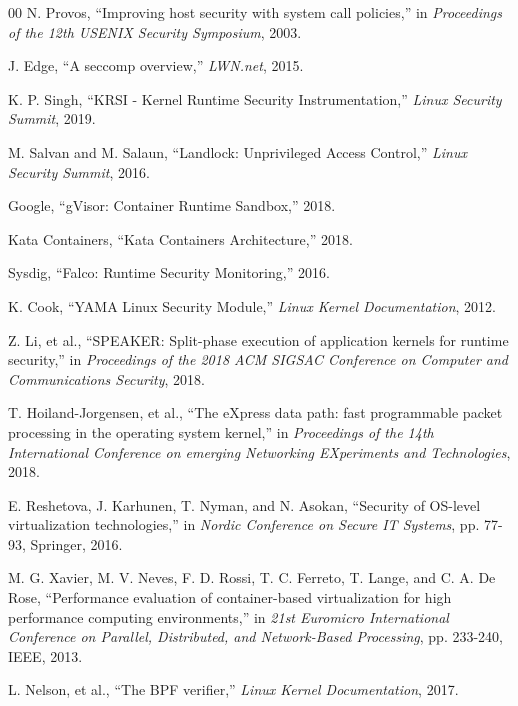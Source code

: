 \documentclass[conference]{IEEEtran}
\begin{document}

\begin{thebibliography}{00}
 N. Provos, ``Improving host security with system call policies,'' in \textit{Proceedings of the 12th USENIX Security Symposium}, 2003.

 J. Edge, ``A seccomp overview,'' \textit{LWN.net}, 2015.

 K. P. Singh, ``KRSI - Kernel Runtime Security Instrumentation,'' \textit{Linux Security Summit}, 2019.

 M. Salvan and M. Salaun, ``Landlock: Unprivileged Access Control,'' \textit{Linux Security Summit}, 2016.

 Google, ``gVisor: Container Runtime Sandbox,'' 2018.

 Kata Containers, ``Kata Containers Architecture,'' 2018.

 Sysdig, ``Falco: Runtime Security Monitoring,'' 2016.

 K. Cook, ``YAMA Linux Security Module,'' \textit{Linux Kernel Documentation}, 2012.

 Z. Li, et al., ``SPEAKER: Split-phase execution of application kernels for runtime security,'' in \textit{Proceedings of the 2018 ACM SIGSAC Conference on Computer and Communications Security}, 2018.

 T. Hoiland-Jorgensen, et al., ``The eXpress data path: fast programmable packet processing in the operating system kernel,'' in \textit{Proceedings of the 14th International Conference on emerging Networking EXperiments and Technologies}, 2018.

 E. Reshetova, J. Karhunen, T. Nyman, and N. Asokan, ``Security of OS-level virtualization technologies,'' in \textit{Nordic Conference on Secure IT Systems}, pp. 77-93, Springer, 2016.

 M. G. Xavier, M. V. Neves, F. D. Rossi, T. C. Ferreto, T. Lange, and C. A. De Rose, ``Performance evaluation of container-based virtualization for high performance computing environments,'' in \textit{21st Euromicro International Conference on Parallel, Distributed, and Network-Based Processing}, pp. 233-240, IEEE, 2013.

 L. Nelson, et al., ``The BPF verifier,'' \textit{Linux Kernel Documentation}, 2017.


\end{thebibliography}
\end{document}
